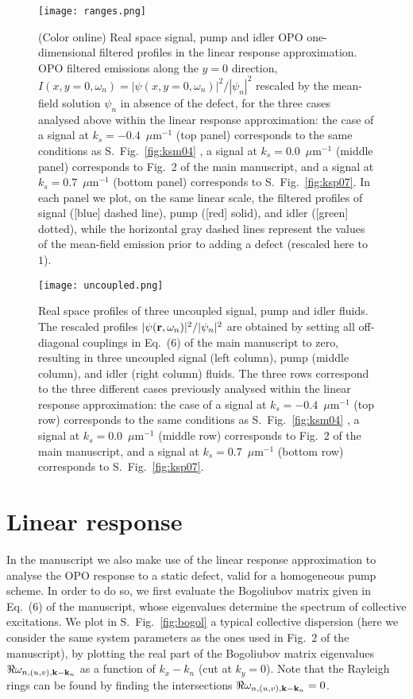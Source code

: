 %
\begin{figure}[h!]
\texttt{[image: ranges.png]}
\caption{(Color online) Real space signal, pump and idler OPO
  one-dimensional filtered profiles in the linear response
  approximation. OPO filtered emissions along the $y=0$ direction, $I
  (x, y=0, \omega_n) = |\psi(x,y=0, \omega_n)|^2/|\psi_n|^2$ rescaled
  by the mean-field solution $\psi_n$ in absence of the defect, for
  the three cases analysed above within the linear response
  approximation: the case of a signal at $k_s = -0.4$~$\mu$m$^{-1}$
  (top panel) corresponds to the same conditions as
  S.~Fig.~\ref{fig:ksm04} , a signal at $k_s = 0.0$~$\mu$m$^{-1}$
  (middle panel) corresponds to Fig.~2 of the main manuscript, and a
  signal at $k_s = 0.7$~$\mu$m$^{-1}$ (bottom panel) corresponds to
  S.~Fig.~\ref{fig:ksp07}. In each panel we plot, on the same linear
  scale, the filtered profiles of signal ([blue] dashed line), pump
  ([red] solid), and idler ([green] dotted), while the horizontal gray
  dashed lines represent the values of the mean-field emission prior
  to adding a defect (rescaled here to $1$).}
\label{fig:range}
\end{figure}
%
\begin{figure}[h!]
\texttt{[image: uncoupled.png]}
\caption{Real space profiles of three uncoupled signal, pump and idler
  fluids. The rescaled profiles $|\psi
  ({\mathbf r},\omega_n)|^2/|\psi_n|^2$ are obtained by setting all
  off-diagonal couplings in Eq.~(6) of the main manuscript to zero,
  resulting in three uncoupled signal (left column), pump (middle
  column), and idler (right column) fluids. The three rows correspond
  to the three different cases previously analysed within the linear
  response approximation: the case of a signal at $k_s =
  -0.4$~$\mu$m$^{-1}$ (top row) corresponds to the same conditions as
  S.~Fig.~\ref{fig:ksm04} , a signal at $k_s = 0.0$~$\mu$m$^{-1}$
  (middle row) corresponds to Fig.~2 of the main manuscript, and a
  signal at $k_s = 0.7$~$\mu$m$^{-1}$ (bottom row) corresponds to
  S.~Fig.~\ref{fig:ksp07}.}
\label{fig:uncou}
\end{figure}
%
\section{Linear response}
\label{sec:analy}
%
In the manuscript we also make use of the linear response
approximation to analyse the OPO response to a static defect, valid
for a homogeneous pump scheme. In order to do so, we first evaluate
the Bogoliubov matrix given in Eq.~(6) of the manuscript, whose
eigenvalues determine the spectrum of collective excitations. We plot
in S.~Fig.~\ref{fig:bogol} a typical collective dispersion (here we
consider the same system parameters as the ones used in Fig.~2 of the
manuscript), by plotting the real part of the Bogoliubov matrix
eigenvalues $\Re \omega_{n,(u,v),{\mathbf k}-{\mathbf k}_n}$ as a function
of $k_x - k_n$ (cut at $k_y=0$). Note that the Rayleigh rings can be
found by finding the intersections $\Re
\omega_{n,(u,v),{\mathbf k}-{\mathbf k}_n}=0$.


